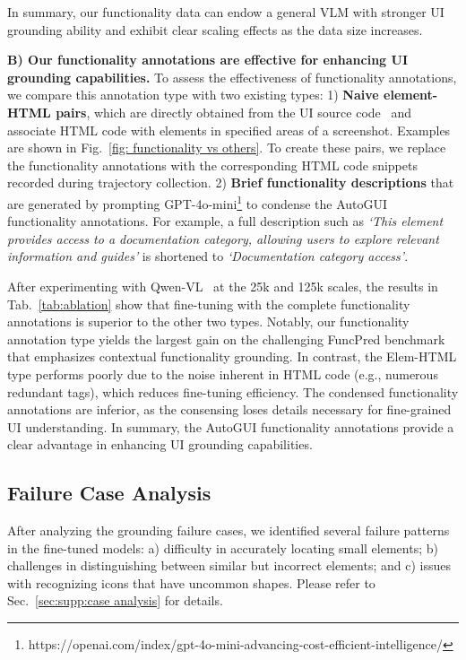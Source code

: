 In summary, our functionality data can endow a general VLM with stronger UI grounding ability and exhibit clear scaling effects as the data size increases.




\noindent\textbf{B) Our functionality annotations are effective for enhancing UI grounding capabilities.} To assess the effectiveness of functionality annotations, we compare this annotation type with two existing types: 1) \textbf{Naive element-HTML pairs}, which are directly obtained from the UI source code~\citep{hong2023cogagent} and associate HTML code with elements in specified areas of a screenshot. Examples are shown in Fig.~\ref{fig: functionality vs others}. To create these pairs, we replace the functionality annotations with the corresponding HTML code snippets recorded during trajectory collection. 2) \textbf{Brief functionality descriptions} that are generated by prompting GPT-4o-mini\footnote{https://openai.com/index/gpt-4o-mini-advancing-cost-efficient-intelligence/} to condense the AutoGUI functionality annotations. For example, a full description such as \textit{`This element provides access to a documentation category, allowing users to explore relevant information and guides'} is shortened to \textit{`Documentation category access'}.

After experimenting with Qwen-VL~\citep{bai2023qwen} at the 25k and 125k scales, the results in Tab.~\ref{tab:ablation} show that fine-tuning with the complete functionality annotations is superior to the other two types. Notably, our functionality annotation type yields the largest gain on the challenging FuncPred benchmark that emphasizes contextual functionality grounding. In contrast, the Elem-HTML type performs poorly due to the noise inherent in HTML code (e.g., numerous redundant tags), which reduces fine-tuning efficiency. The condensed functionality annotations are inferior, as the consensing loses details necessary for fine-grained UI understanding. In summary, the AutoGUI functionality annotations provide a clear advantage in enhancing UI grounding capabilities.


\subsection{Failure Case Analysis}
After analyzing the grounding failure cases, we identified several failure patterns in the fine-tuned models: a) difficulty in accurately locating small elements; b) challenges in distinguishing between similar but incorrect elements; and c) issues with recognizing icons that have uncommon shapes. Please refer to Sec.~\ref{sec:supp:case analysis} for details.


